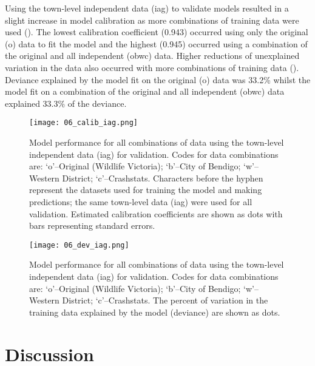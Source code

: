 Using the town-level independent data (iag) to validate models resulted in a slight increase in model calibration as more combinations of training data were used ().  The lowest calibration coefficient (0.943) occurred using only the original (o) data to fit the model and the highest (0.945) occurred using a combination of the original and all independent (obwc) data. Higher reductions of unexplained variation in the data also occurred with more combinations of training data (). Deviance explained by the model fit on the original (o) data was 33.2\% whilst the model fit on a combination of the original and all independent (obwc) data explained 33.3\% of the deviance.

\begin{figure*}[!t]
  \centering
  \texttt{[image: 06\_calib\_iag.png]}
  \caption[Model calibration for all combinations of training data using the town-level independent data for validation]{Model performance for all combinations of data using the town-level independent data (iag) for validation. Codes for data combinations are: `o'--Original (Wildlife Victoria); `b'--City of Bendigo; `w'--Western District; `c'--Crashstats. Characters before the hyphen represent the datasets used for training the model and making predictions; the same town-level data (iag) were used for all validation. Estimated calibration coefficients are shown as dots with bars representing standard errors.}
  \label{val_calib_iag}
\end{figure*}

\begin{figure*}[!t]
  \centering
  \texttt{[image: 06\_dev\_iag.png]}
  \caption[Model discrimination ability for all combinations of training data using the town-level independent data for validation]{Model performance for all combinations of data using the town-level independent data (iag) for validation. Codes for data combinations are: `o'--Original (Wildlife Victoria); `b'--City of Bendigo; `w'--Western District; `c'--Crashstats. The percent of variation in the training data explained by the model (deviance) are shown as dots.}
  \label{val_calib_dev}
\end{figure*}

\section{Discussion}

